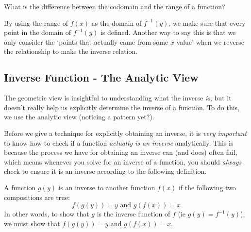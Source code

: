 \documentclass{ximeraXloud}
\begin{document}
\begin{problem}
    What is the difference between the codomain and the range of a function?
    \begin{multipleChoice}
    \end{multipleChoice}
\end{problem}

By using the range of $f(x)$ as the domain of $f^{-1}(y)$, we make sure that every point in the domain of $f^{-1}(y)$ is defined. Another way to say this is that we only consider the `points that actually came from some $x$-value' when we reverse the relationship to make the inverse relation.

\subsection*{Inverse Function - The Analytic View}

The geometric view is insightful to understanding what the inverse \textit{is}, but it doesn't really help us explicitly determine the inverse of a function. To do this, we use the analytic view (noticing a pattern yet?).

Before we give a technique for explicitly obtaining an inverse, it is \textit{very important} to know how to check if a function \textit{actually is an inverse} analytically. This is because the process we have for obtaining an inverse can (and does) often fail, which means whenever you solve for an inverse of a function, you should \textit{always} check to ensure it is an inverse according to the following definition.

\begin{definition}
    A function $g(y)$ is an inverse to another function $f(x)$ if the following two compositions are true:
    \[
        f(g(y)) = y \text{ and } g(f(x)) = x
    \]
    In other words, to show that $g$ is the inverse function of $f$ (ie $g(y) = f^{-1}(y)$), we must show that $f(g(y)) = y$ and $g(f(x)) = x$.
\end{definition}
\end{document}
